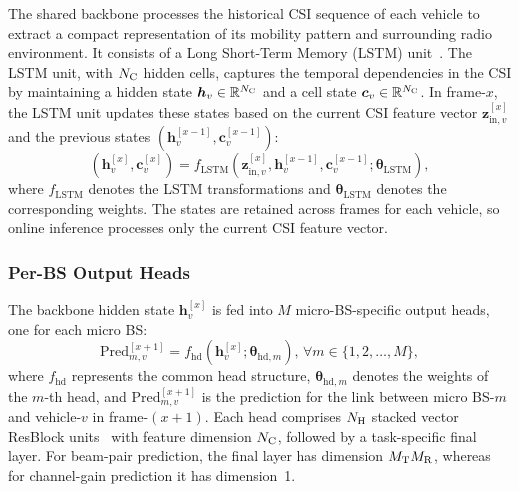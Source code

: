 \documentclass[conference, a4paper]{IEEEtran}
\newcommand{\rev}[1]{\textcolor{revisioncolor}{{}#1}}
\theoremstyle{remark}
\newtheorem*{remark}{Remark}
\begin{document}
The shared backbone processes the historical CSI sequence of each vehicle to extract a compact representation of its mobility pattern and surrounding radio environment. It consists of a Long Short-Term Memory (LSTM) unit~\cite{lstm}. 
The LSTM unit, with $N_{\rm C}$ hidden cells, captures the temporal dependencies in the CSI by maintaining a hidden state $\bm{h}_v \in \mathbb{R}^{N_{\rm C}}$ and a cell state $\bm{c}_v \in \mathbb{R}^{N_{\rm C}}$. In frame-$x$, the LSTM unit updates these states based on the current CSI feature vector $\bm{z}_{\text{in},v}^{[x]}$ and the previous states $(\bm{h}_v^{[x-1]}, \bm{c}_v^{[x-1]})$:
\begin{equation}
\label{eq:lstm_update}
    \left(\bm{h}_v^{[x]}, \bm{c}_v^{[x]}\right) = f_{\text{LSTM}} \left(\bm{z}_{\text{in},v}^{[x]}, \bm{h}_v^{[x-1]}, \bm{c}_v^{[x-1]} ;\bm{\theta}_{\text{LSTM}} \right),
\end{equation}
where $f_{\text{LSTM}}$ denotes the LSTM transformations and $\bm{\theta}_{\text{LSTM}}$ denotes the corresponding weights. 
\rev{The states are retained across frames for each vehicle, so online inference processes only the current CSI feature vector.}

\subsubsection{Per-BS Output Heads}
The backbone hidden state $\bm{h}_v^{[x]}$ is fed into $M$ micro-BS-specific output heads, one for each micro BS:
\begin{equation}
\label{eq:OutputHead}
    \text{Pred}_{m,v}^{[x+1]} = f_{\text{hd}} \left(\bm{h}_v^{[x]};\bm{\theta}_{\text{hd},m} \right), \, \forall m \in \{1,2,\dots,M\},
\end{equation}
where $f_{\text{hd}}$ represents the common head structure, 
$\bm{\theta}_{\text{hd},m}$ denotes the weights of the $m$-th head, and $\text{Pred}_{m,v}^{[x+1]}$ is the prediction for the link between micro BS-$m$ and vehicle-$v$ in frame-$(x\!+\!1)$.
Each head comprises $N_{\rm H}$ stacked vector ResBlock units~\cite{He2016} with feature dimension $N_{\rm C}$, followed by a task-specific final layer. For beam-pair prediction, the final layer has dimension $M_{\rm T}M_{\rm R}$, whereas for channel-gain prediction it has dimension~1.
\end{document}
